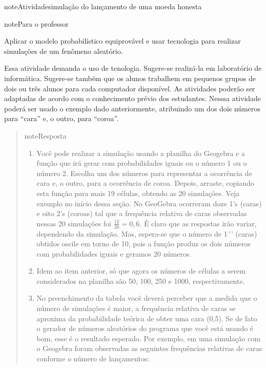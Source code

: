 \begin{sphinxadmonition}{note}{Atividade}{simulação do lançamento de uma moeda honesta}
\label{ativ-simulacao-moeda}

\begin{sphinxadmonition}{note}{Para o professor}

 Aplicar o modelo probabilístico equiprovável e usar tecnologia para realizar simulações de um fenômeno aleatório.

 Essa atividade demanda o uso de tenologia. Sugere-se realizá-la em laboratório de informática. Sugere-se também que os alunos trabalhem em pequenos grupos de dois ou três alunos para cada computador disponível. As atividades poderão ser adaptadas de acordo com o conhecimento prévio dos estudantes. Nesssa atividade poderá ser usado o exemplo dado anteriormente, atribuindo um dos dois números para “cara” e, o outro, para “coroa”.
\begin{quote}

\begin{sphinxadmonition}{note}{Resposta}

\begin{enumerate}
\item {} 
Você pode realizar a simulação usando a planilha do Geogebra e a função  que irá gerar com probabilidades iguais ou o número 1 ou o número 2. Escolha um dos números para representar a ocorrência de cara e, o outro, para a ocorrência de coroa. Depois, arraste, copiando esta função para mais 19 células, obtendo as 20 simulações. Veja exemplo no início dessa seção. No GeoGebra ocorreram doze 1’s (caras) e oito 2’s (coroas) tal que a frequência relativa de caras observadas nessas 20 simulações foi \(\frac{12}{20}=0,6\). É claro que as respostas irão variar, dependendo da simulação. Mas, espera-se que o número de 1´’ (caras) obtidos oscile em torno de 10, pois a função produz os dois números com probabilidades iguais e geramos 20 números.

\item {} 
Idem ao item anterior, só que agora os números de células a serem considerados na planilha são 50, 100, 250 e 1000, respectivamente.

\item {} 
No preenchimento da tabela você deverá perceber que a medida que o número de simulações é maior, a frequência relativa de caras se aproxima da probabilidade teórica  de obter uma cara (0,5). Se de fato o gerador de números aleatórios do programa que você está usando é bom, esse é o resultado esperado. Por exemplo, em uma simulação com o Geogebra foram observadas as seguintes frequências relativas de caras conforme o número de lançamentos:


\end{enumerate}
\end{sphinxadmonition}
\end{quote}
\end{sphinxadmonition}
\end{sphinxadmonition}
